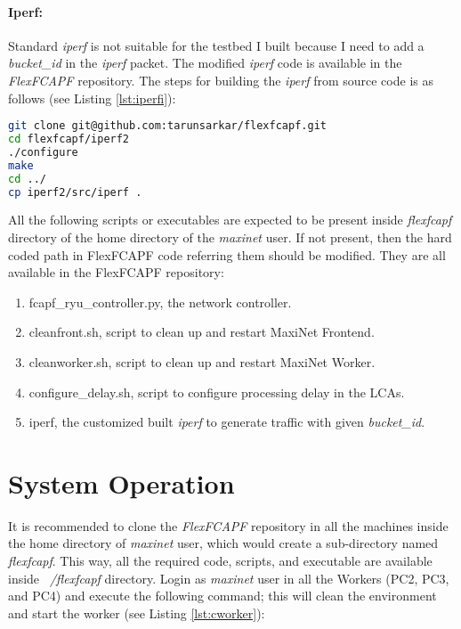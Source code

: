\paragraph{Iperf:} 
Standard \textit{iperf} is not suitable for the testbed I built because I need to add a \textit{bucket\_id} in the \textit{iperf} packet. The modified \textit{iperf} code is available in the \textit{FlexFCAPF} repository. The steps for building the \textit{iperf} from source code is as follows (see Listing \ref{lst:iperfi}):

\begin{lstlisting}[caption={Iperf installation},label={lst:iperfi},language=bash,tabsize=2,basicstyle=\footnotesize,breaklines=true,showspaces=false,showstringspaces=false,showtabs=false,frame=single]
git clone git@github.com:tarunsarkar/flexfcapf.git
cd flexfcapf/iperf2
./configure
make
cd ../
cp iperf2/src/iperf .
\end{lstlisting}

All the following scripts or executables are expected to be present inside \textit{flexfcapf} directory of the home directory of the \textit{maxinet} user. If not present, then the hard coded path in FlexFCAPF code referring them should be modified. They are all available in the FlexFCAPF repository:

\begin{enumerate}
	\item fcapf\_ryu\_controller.py, the network controller.
	\item cleanfront.sh, script to clean up and restart MaxiNet Frontend.
	\item cleanworker.sh, script to clean up and restart MaxiNet Worker.
	\item configure\_delay.sh, script to configure processing delay in the LCAs.
	\item iperf, the customized built \textit{iperf} to generate traffic with given \textit{bucket\_id}.
\end{enumerate}

\section{System Operation}
It is recommended to clone the \textit{FlexFCAPF} repository in all the machines inside the home directory of \textit{maxinet} user, which would create a sub-directory named \textit{flexfcapf}. This way, all the required code, scripts, and executable are available inside \textit{~/flexfcapf} directory. Login as \textit{maxinet} user in all the Workers (PC2, PC3, and PC4) and execute the following command; this will clean the environment and start the worker (see Listing \ref{lst:cworker}):


